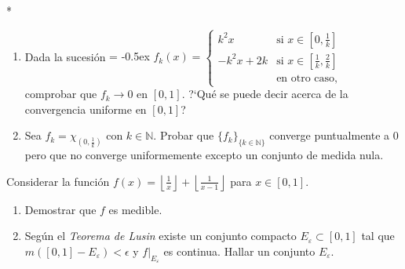 \documentclass{book}
\newcommand{\nn}{\mathbb{N}}
\begin{document}
\begin{ejer} {}*
\begin{enumerate} 
\item Dada la sucesión
{
\extrarowheight = -0.5ex
\renewcommand{\arraystretch}{2.0}
$f_k(x)=\left\{
\begin{array}{cl}
k^2x &\mbox{si }x\in[0,\frac{1}{k}]
\\
-k^2x+2k &\mbox{si } x\in \left[\frac{1}{k},\frac{2}{k}\right] 
\\
&\mbox{en otro caso,}
\end{array}
\right.
$}\\
comprobar que $f_k \to 0$ en $[0,1]$. 
?`Qué se puede decir acerca de la convergencia uniforme en $[0,1]$?
\item Sea $f_k=\chi_{(0,\frac{1}{k})}$ con $k\in\nn$. 
Probar que $\{f_k\}_{\{k\in\nn\}}$ converge puntualmente a $0$ pero que no converge uniformemente
excepto un conjunto de medida nula.
\end{enumerate}
\end{ejer}

\begin{ejer}{}  
Considerar la funci\'on 
$f(x)=\left\lfloor \frac{1}{x}\right\rfloor+\left\lfloor \frac{1}{x-1}\right\rfloor$
para $x \in [0,1]$.
\begin{enumerate}
\item Demostrar que $f$ es medible.
\item Seg\'un el \textit{Teorema de Lusin} existe  un conjunto compacto $E_{\varepsilon}\subset [0,1]$
tal que $m\left([0,1]-E_{\varepsilon}\right)<\epsilon$ y $f\left.\right|_{E_{\varepsilon}}$ es continua.
Hallar un conjunto $E_{\varepsilon}$.
\end{enumerate}
\end{ejer}


\end{document}
